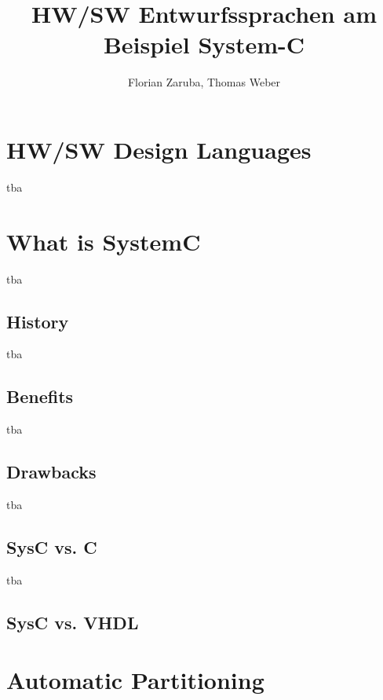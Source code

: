 \documentclass{article}
\begin{document}
	\title{HW/SW Entwurfssprachen am Beispiel System-C}
	\author{Florian Zaruba, Thomas Weber}

	\maketitle


	\section{HW/SW Design Languages}
	tba
	\section{What is SystemC}
	tba
	  \subsection{History}
	  tba
	  \subsection{Benefits}
	  tba
	  \subsection{Drawbacks}
	  tba
	  \subsection{SysC vs. C}
	  tba
	  \subsection{SysC vs. VHDL}

	\section{Automatic Partitioning}
\end{document}
